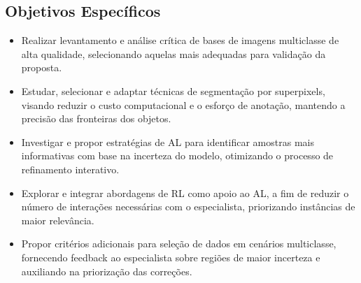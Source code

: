 \subsection{Objetivos Específicos}


\begin{itemize}


\item Realizar levantamento e análise crítica de bases de imagens multiclasse de alta qualidade, selecionando aquelas mais adequadas para validação da proposta.


\item Estudar, selecionar e adaptar técnicas de segmentação por superpixels, visando reduzir o custo computacional e o esforço de anotação, mantendo a precisão das fronteiras dos objetos.


\item Investigar e propor estratégias de \ac{AL} para identificar amostras mais informativas com base na incerteza do modelo, otimizando o processo de refinamento interativo.


\item Explorar e integrar abordagens de \ac{RL} como apoio ao \ac{AL}, a fim de reduzir o número de interações necessárias com o especialista, priorizando instâncias de maior relevância.


\item Propor critérios adicionais para seleção de dados em cenários multiclasse, fornecendo feedback ao especialista sobre regiões de maior incerteza e auxiliando na priorização das correções.


\end{itemize}
